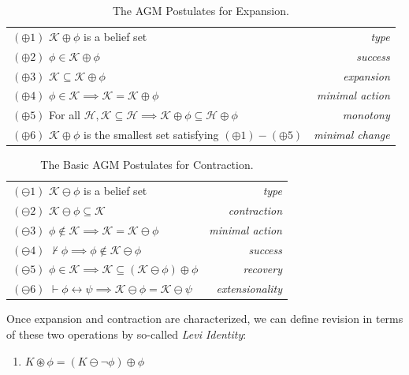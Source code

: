 \documentclass[12pt]{article}
\newcommand{\K}{\mathcal{K}}
\newcommand{\ostar}{\circledast}
\begin{document}
\begin{table}[htpb]
\centering
\begin{tabular}{lr}
\hline
$(\oplus 1)$ $\mathcal{K} \oplus \phi$ is a belief set & \textit{type} \\
$(\oplus 2)$ $\phi \in \K \oplus \phi$ & \textit{success} \\
$(\oplus 3)$ $\K \subseteq \K \oplus \phi$ & \textit{expansion} \\
$(\oplus 4)$ $\phi \in \K \implies \K = \K \oplus \phi$ & \textit{minimal action} \\
$(\oplus 5)$ For all $\mathcal{H}, \mathcal{K} \subseteq \mathcal{H} \implies \mathcal{K} \oplus \phi \subseteq \mathcal{H} \oplus \phi$ & \textit{monotony} \\
$(\oplus 6)$ $\K \oplus \phi$ is the smallest set satisfying $(\oplus 1) - (\oplus 5)$ & \textit{minimal change} \\
\hline
\end{tabular}
\caption{The AGM Postulates for Expansion.}
\label{tab:expansion}
\end{table}
\begin{table}[htpb]
\centering
\begin{tabular}{lr}
\hline
$(\ominus 1)$ $\mathcal{K} \ominus \phi$ is a belief set & \textit{type} \\
$(\ominus 2)$ $\mathcal{K} \ominus \phi \subseteq \mathcal{K}$ & \textit{contraction} \\
$(\ominus 3)$ $\phi \notin \mathcal{K} \implies \mathcal{K} = \mathcal{K} \ominus \phi$ & \textit{minimal action} \\
$(\ominus 4)$ $\not\vdash \phi \implies \phi \notin \mathcal{K} \ominus \phi$ & \textit{success} \\
$(\ominus 5)$ $\phi \in \mathcal{K} \implies \mathcal{K} \subseteq (\mathcal{K} \ominus \phi) \oplus \phi$ & \textit{recovery} \\
$(\ominus 6)$ $\vdash \phi \leftrightarrow \psi \implies \mathcal{K} \ominus \phi = \mathcal{K} \ominus \psi$ & \textit{extensionality} \\
\hline
\end{tabular}
\caption{The Basic AGM Postulates for Contraction.}
\label{tab:pm contraction}
\end{table}
\par
Once expansion and contraction are characterized, we can define revision in terms of these two operations by so-called \textit{Levi Identity}: 
\begin{enumerate}
    \centering
    \item[Levi Identity:] $K \ostar \phi = (K \ominus \neg\phi) \oplus \phi$
\end{enumerate}
\end{document}
